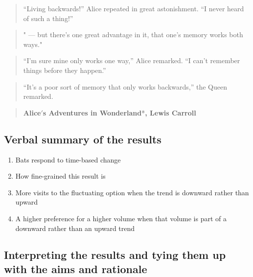 \documentclass[
]{article}
\providecommand{\tightlist}{%
  \setlength{\itemsep}{0pt}\setlength{\parskip}{0pt}}
\begin{document}
\begin{quote}
``Living backwards!'' Alice repeated in great astonishment. ``I never heard of such a thing!''
\end{quote}

\begin{quote}
" --- but there's one great advantage in it, that one's memory works both ways."
\end{quote}

\begin{quote}
``I'm sure mine only works one way,'' Alice remarked. ``I can't remember things before they happen.''
\end{quote}

\begin{quote}
``It's a poor sort of memory that only works backwards,'' the Queen remarked.
\end{quote}

\begin{quote}
\hfill *\textbf{Alice\('\)s Adventures in Wonderland}*\textbf{, Lewis Carroll}
\end{quote}

\hypertarget{verbal-summary-of-the-results}{%
\subsection{Verbal summary of the results}\label{verbal-summary-of-the-results}}

\begin{enumerate}
\def\labelenumi{\arabic{enumi}.}
\tightlist
\item
  Bats respond to time-based change
\item
  How fine-grained this result is
\item
  More visits to the fluctuating option when the trend is downward rather than upward
\item
  A higher preference for a higher volume when that volume is part of a downward rather than an upward trend
\end{enumerate}

\hypertarget{interpreting-the-results-and-tying-them-up-with-the-aims-and-rationale}{%
\subsection{Interpreting the results and tying them up with the aims and rationale}\label{interpreting-the-results-and-tying-them-up-with-the-aims-and-rationale}}
\end{document}

